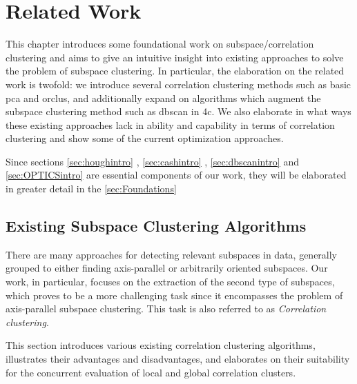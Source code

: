 \chapter{Related Work}
\label{sec:Related Work}
This chapter introduces some foundational work on subspace/correlation clustering and aims to give an intuitive insight into existing approaches to solve the problem of subspace clustering. In particular, the elaboration on the related work is twofold: we introduce several correlation clustering methods such as basic \acrshort{pca} and \acrshort{orclus}, and additionally expand on algorithms which augment the subspace clustering method such as \acrshort{dbscan} in \acrshort{4c}. We also elaborate in what ways these existing approaches lack in ability and capability in terms of correlation clustering and show some of the current optimization approaches.

Since sections \ref*{sec:houghintro} , \ref*{sec:cashintro} , \ref*{sec:dbscanintro}  and \ref*{sec:OPTICSintro}  are essential components of our work, they will be elaborated in greater detail in the \autoref{sec:Foundations} 

\section{Existing Subspace Clustering Algorithms}
There are many approaches for detecting relevant subspaces in data, generally grouped to either finding axis-parallel or arbitrarily oriented subspaces. Our work, in particular, focuses on the extraction of the second type of subspaces, which proves to be a more challenging task since it encompasses the problem of axis-parallel subspace clustering. This task is also referred to as \textit{Correlation clustering}. 

This section introduces various existing correlation clustering algorithms, illustrates their advantages and disadvantages, and elaborates on their suitability for the concurrent evaluation of local and global correlation clusters.

